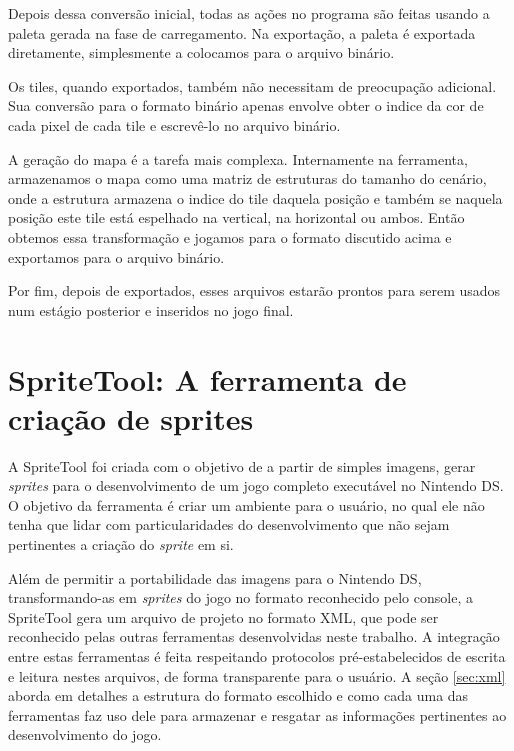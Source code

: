 \documentclass[brazil]{abnt}
\begin{document}
Depois dessa conversão inicial, todas as ações no programa são feitas usando a paleta gerada na fase de carregamento. Na exportação, a paleta é exportada diretamente, simplesmente a colocamos para o arquivo binário.

Os tiles, quando exportados, também não necessitam de preocupação adicional. Sua conversão para o formato binário apenas envolve obter o indice da cor de cada pixel de cada tile e escrevê-lo no arquivo binário.

A geração do mapa é a tarefa mais complexa. Internamente na ferramenta, armazenamos o mapa como uma matriz de estruturas do tamanho do cenário, onde a estrutura armazena o indice do tile daquela posição e também se naquela posição este tile está espelhado na vertical, na horizontal ou ambos. Então obtemos essa transformação e jogamos para o formato discutido acima e exportamos para o arquivo binário.

Por fim, depois de exportados, esses arquivos estarão prontos para serem usados num estágio posterior e inseridos no jogo final.

\section{SpriteTool: A ferramenta de criação de sprites}

A SpriteTool foi criada com o objetivo de a partir de simples imagens, gerar \textit{sprites} para o desenvolvimento de um jogo completo executável no Nintendo DS. O objetivo da ferramenta é criar um ambiente para o usuário, no qual ele não tenha que lidar com particularidades do desenvolvimento que não sejam pertinentes a criação do \textit{sprite} em si.

Além de permitir a portabilidade das imagens para o Nintendo DS, transformando-as em \textit{sprites} do jogo no formato reconhecido pelo console, a SpriteTool gera um arquivo de projeto no formato XML, que pode ser reconhecido pelas outras ferramentas desenvolvidas neste trabalho. A integração entre estas ferramentas é feita respeitando protocolos pré-estabelecidos de escrita e leitura nestes arquivos, de forma transparente para o usuário. A seção \ref{sec:xml} aborda em detalhes a estrutura do formato escolhido e como cada uma das ferramentas faz uso dele para armazenar e resgatar as informações pertinentes ao desenvolvimento do jogo.
\end{document}
